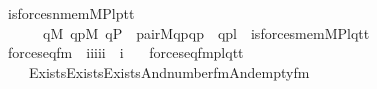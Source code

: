 \begin{isabellebody}
\ \ {\isachardoublequoteopen}is{\isacharunderscore}{\kern0pt}forces{\isacharunderscore}{\kern0pt}nmem{\isacharprime}{\kern0pt}{\isacharparenleft}{\kern0pt}M{\isacharcomma}{\kern0pt}P{\isacharcomma}{\kern0pt}l{\isacharcomma}{\kern0pt}p{\isacharcomma}{\kern0pt}t{}{\isacharcomma}{\kern0pt}t{}{\isacharparenright}{\kern0pt}\ {\isasymequiv}\isanewline
\ \ \ \ \ \ {\isasymnot}\ {\isacharparenleft}{\kern0pt}{\isasymexists}q{\isacharbrackleft}{\kern0pt}M{\isacharbrackright}{\kern0pt}{\isachardot}{\kern0pt}\ {\isasymexists}qp{\isacharbrackleft}{\kern0pt}M{\isacharbrackright}{\kern0pt}{\isachardot}{\kern0pt}\ q{\isasymin}P\ {\isasymand}\ pair{\isacharparenleft}{\kern0pt}M{\isacharcomma}{\kern0pt}q{\isacharcomma}{\kern0pt}p{\isacharcomma}{\kern0pt}qp{\isacharparenright}{\kern0pt}\ {\isasymand}\ qp{\isasymin}l\ {\isasymand}\ is{\isacharunderscore}{\kern0pt}forces{\isacharunderscore}{\kern0pt}mem{\isacharprime}{\kern0pt}{\isacharparenleft}{\kern0pt}M{\isacharcomma}{\kern0pt}P{\isacharcomma}{\kern0pt}l{\isacharcomma}{\kern0pt}q{\isacharcomma}{\kern0pt}t{}{\isacharcomma}{\kern0pt}t{}{\isacharparenright}{\kern0pt}{\isacharparenright}{\kern0pt}{\isachardoublequoteclose}\isanewline
\isanewline
{}\isamarkupfalse%
\isanewline
\ \ forces{\isacharunderscore}{\kern0pt}eq{\isacharunderscore}{\kern0pt}fm\ {\isacharcolon}{\kern0pt}{\isacharcolon}{\kern0pt}\ {\isachardoublequoteopen}{\isacharbrackleft}{\kern0pt}i{\isacharcomma}{\kern0pt}i{\isacharcomma}{\kern0pt}i{\isacharcomma}{\kern0pt}i{\isacharcomma}{\kern0pt}i{\isacharbrackright}{\kern0pt}\ {\isasymRightarrow}\ i{\isachardoublequoteclose}\ \isanewline
\ \ {\isachardoublequoteopen}forces{\isacharunderscore}{\kern0pt}eq{\isacharunderscore}{\kern0pt}fm{\isacharparenleft}{\kern0pt}p{\isacharcomma}{\kern0pt}l{\isacharcomma}{\kern0pt}q{\isacharcomma}{\kern0pt}t{}{\isacharcomma}{\kern0pt}t{}{\isacharparenright}{\kern0pt}\ {\isasymequiv}\isanewline
\ \ \ \ \ Exists{\isacharparenleft}{\kern0pt}Exists{\isacharparenleft}{\kern0pt}Exists{\isacharparenleft}{\kern0pt}And{\isacharparenleft}{\kern0pt}number{}{\isacharunderscore}{\kern0pt}fm{\isacharparenleft}{\kern0pt}{}{\isacharparenright}{\kern0pt}{\isacharcomma}{\kern0pt}And{\isacharparenleft}{\kern0pt}empty{\isacharunderscore}{\kern0pt}fm{\isacharparenleft}{\kern0pt}{}{\isacharparenright}{\kern0pt}{\isacharcomma}{\kern0pt}\isanewline

\end{isabellebody}
